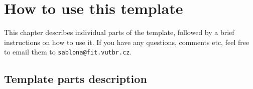 





\chapter{How to use this template}
\label{jak}

This chapter describes individual parts of the template, followed by a brief instructions on how to use it. If you have any questions, comments etc, feel free to email them to \texttt{sablona@fit.vutbr.cz}.

\section*{Template parts description}

